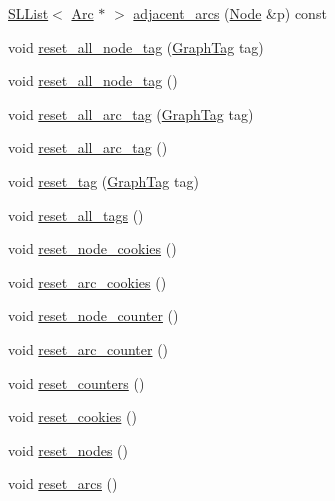 \begin{DoxyCompactItemize}
\hyperlink{class_designar_1_1_s_l_list}{S\+L\+List}$<$ \hyperlink{namespace_designar_a3f55fb5513d62ff47cbc8f72b8e95d6f}{Arc} $\ast$ $>$ \hyperlink{class_designar_1_1_base_graph_a2c91912381c8220c0b2530e5ad187231}{adjacent\+\_\+arcs} (\hyperlink{namespace_designar_a5af326c65aa2bd26b26c410f2030d09e}{Node} \&p) const
\item 
void \hyperlink{class_designar_1_1_base_graph_a07ca1909d77210157b8b9571a4d35d6c}{reset\+\_\+all\+\_\+node\+\_\+tag} (\hyperlink{namespace_designar_ac91366256ea6ea6ac5fd483d55a7499e}{Graph\+Tag} tag)
\item 
void \hyperlink{class_designar_1_1_base_graph_a7bffa4f055b15f76d12bd7c40730a3dd}{reset\+\_\+all\+\_\+node\+\_\+tag} ()
\item 
void \hyperlink{class_designar_1_1_base_graph_ab73705a167e91d0982a9f149b1d7e71b}{reset\+\_\+all\+\_\+arc\+\_\+tag} (\hyperlink{namespace_designar_ac91366256ea6ea6ac5fd483d55a7499e}{Graph\+Tag} tag)
\item 
void \hyperlink{class_designar_1_1_base_graph_af9ae2a4dfd676090de4b4fa04414989c}{reset\+\_\+all\+\_\+arc\+\_\+tag} ()
\item 
void \hyperlink{class_designar_1_1_base_graph_ae8845b2eb9d33f62684c8e5acc7c91b7}{reset\+\_\+tag} (\hyperlink{namespace_designar_ac91366256ea6ea6ac5fd483d55a7499e}{Graph\+Tag} tag)
\item 
void \hyperlink{class_designar_1_1_base_graph_ae62e72668468a2aaa3ddc91246e1ee1c}{reset\+\_\+all\+\_\+tags} ()
\item 
void \hyperlink{class_designar_1_1_base_graph_ab797f80e7efa5a6d0b33f925d6079c18}{reset\+\_\+node\+\_\+cookies} ()
\item 
void \hyperlink{class_designar_1_1_base_graph_a44b6cefb8966ed69a0d80bfe7e4546cb}{reset\+\_\+arc\+\_\+cookies} ()
\item 
void \hyperlink{class_designar_1_1_base_graph_a53603f64b51b470cc6b8c8d6d2b643a4}{reset\+\_\+node\+\_\+counter} ()
\item 
void \hyperlink{class_designar_1_1_base_graph_a8b22e29aa37006fab9c219de86660bdd}{reset\+\_\+arc\+\_\+counter} ()
\item 
void \hyperlink{class_designar_1_1_base_graph_a881c342d8f25d43f995ccfdf876622e1}{reset\+\_\+counters} ()
\item 
void \hyperlink{class_designar_1_1_base_graph_a96a630fd589c34e7e6242f4349606e1c}{reset\+\_\+cookies} ()
\item 
void \hyperlink{class_designar_1_1_base_graph_a1b21c48fed41f36ad4158d718f837c89}{reset\+\_\+nodes} ()
\item 
void \hyperlink{class_designar_1_1_base_graph_a6dc66191c2d752bf7f67a4522a7830e3}{reset\+\_\+arcs} ()
\end{DoxyCompactItemize}
